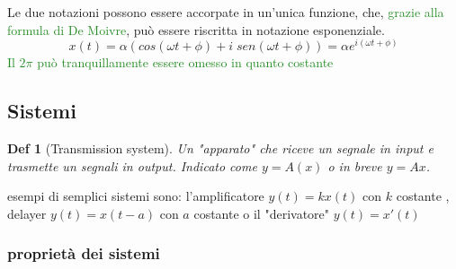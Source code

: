 \documentclass[a4paper]{article}
\newtheorem*{definition}{Def}
\newcommand{\appunto}[1]{\textcolor{ForestGreen}{#1}}
\begin{document}
Le due notazioni possono essere accorpate in un'unica funzione, che, \appunto{grazie alla formula di De Moivre}, può essere riscritta in notazione esponenziale.
$$x(t) = \alpha (cos(\omega t + \phi) + i \; sen ( \omega t + \phi)) = \alpha e^{i(\omega t + \phi)}$$
\appunto{Il $2 \pi$ può tranquillamente essere omesso in quanto costante}

\subsection{Sistemi}
\begin{definition}[Transmission system]
	Un "apparato" che riceve un segnale in input e trasmette un segnali in output. Indicato come $y=A(x)$ o in breve $y=Ax$.
\end{definition}
esempi di semplici sistemi sono: l'amplificatore $y(t) = kx(t)$ con $k$ costante , delayer $y(t) = x(t-a)$ con $a$ costante o il "derivatore" $y(t) = x'(t)$

\subsubsection{proprietà dei sistemi}
\end{document}
